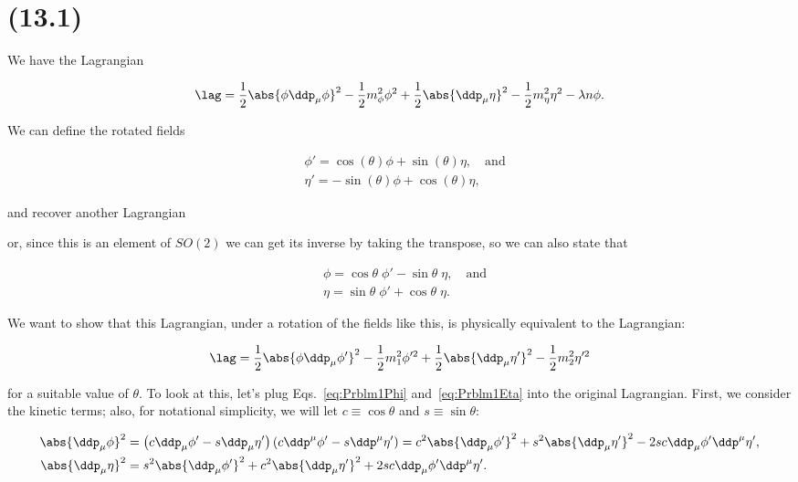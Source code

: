 \section{(13.1)} 


We have the Lagrangian

\begin{equation}
    \lag = \frac{1}{2}\abs{\phi\ddp_{\mu}\phi}^2 - \frac{1}{2}m_{\phi}^2\phi^2 + \frac{1}{2}\abs{\ddp_{\mu}\eta}^2 - \frac{1}{2}m_{\eta}^2\eta^2 - \lambda n\phi.
\end{equation}

We can define the rotated fields

\begin{align}
    &\phi' = \cos(\theta)\phi + \sin(\theta)\eta, \quad \mathrm{and} \\
    &\eta' = -\sin(\theta)\phi + \cos(\theta)\eta,
\end{align}

and recover another Lagrangian 

or, since this is an element of $SO(2)$ we can get its inverse by taking the transpose, so we can also state that

\begin{align}
    &\phi = \cos\theta\;\phi' - \sin\theta\;\eta, \quad \mathrm{and}\label{eq:Prblm1Phi} \\
    &\eta = \sin\theta\;\phi' + \cos\theta\;\eta.\label{eq:Prblm1Eta}
\end{align}

We want to show that this Lagrangian, under a rotation of the fields like this, is physically equivalent to the Lagrangian:

\begin{equation}
    \lag = \frac{1}{2}\abs{\phi\ddp_{\mu}\phi'}^2 - \frac{1}{2}m_1^2\phi^{\prime2} + \frac{1}{2}\abs{\ddp_{\mu}\eta'}^2 - \frac{1}{2}m_2^2\eta^{\prime2}
\end{equation}

for a suitable value of $\theta$. To look at this, let's plug Eqs.~\eqref{eq:Prblm1Phi} and~\eqref{eq:Prblm1Eta} into the original Lagrangian. First, we consider the kinetic terms; also, for notational simplicity, we will let $c \equiv \cos\theta$ and $s \equiv \sin\theta$:

\begin{align*}
    \abs{\ddp_{\mu}\phi}^2 &= \left( c\ddp_{\mu}\phi' - s\ddp_{\mu}\eta' \right)\left( c\ddp^{\mu}\phi' - s\ddp^{\mu}\eta' \right) = c^2\abs{\ddp_{\mu}\phi^{\prime}}^2 + s^2\abs{\ddp_{\mu}\eta^{\prime}}^2 - 2sc\ddp_{\mu}\phi'\ddp^{\mu}\eta', \\
    \abs{\ddp_{\mu}\eta}^2 &= s^2\abs{\ddp_{\mu}\phi^{\prime}}^2 + c^2\abs{\ddp_{\mu}\eta^{\prime}}^2 + 2sc\ddp_{\mu}\phi'\ddp^{\mu}\eta'.
\end{align*}

